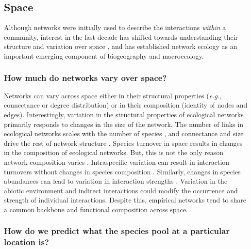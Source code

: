 \subsection{Space}\label{space}

Although networks were initially used to describe the interactions
\emph{within} a community, interest in the last decade has shifted
towards understanding their structure and variation over space
\cite{Trojelsgaard2016EcoNet, Baiser2019EcoRul}, and has established
network ecology as an important emerging component of biogeography and
macroecology.

\subsubsection{How much do networks vary over
space?}\label{how-much-do-networks-vary-over-space}

Networks can vary across space either in their structural properties
(\emph{e.g.,} connectance or degree distribution) or in their composition
(identity of nodes and edges). Interestingly, variation in the
structural properties of ecological networks primarily responds to
changes in the size of the network. The number of links in ecological
networks scales with the number of species \cite{MacDonald2020RevLin,
Brose2004UniSpa}, and connectance and size drive the rest of network
structure \cite{Poisot2014WheEco, Dunne2002FooStr, Riede2010ScaFoo}.
Species turnover in space results in changes in the composition of
ecological networks. But, this is not the only reason network
composition varies \cite{Poisot2015SpeWhy}. Intraspecific variation can
result in interaction turnovers without changes in species composition
\cite{Bolnick2011WhyInt}. Similarly, changes in species abundances can
lead to variation in interaction strengths \cite{Canard2014EmpEva,
Vazquez2007SpeAbu}. Variation in the abiotic environment and indirect
interactions \cite{Golubski2016EcoNet} could modify the occurrence and
strength of individual interactions. Despite this, empirical networks
tend to share a common backbone \cite{Mora2018IdeCom} and functional
composition \cite{Dehling2020SimCom} across space.

\subsubsection{How do we predict what the species pool at a particular
location
is?}\label{how-do-we-predict-what-the-species-pool-at-a-particular-location-is}

